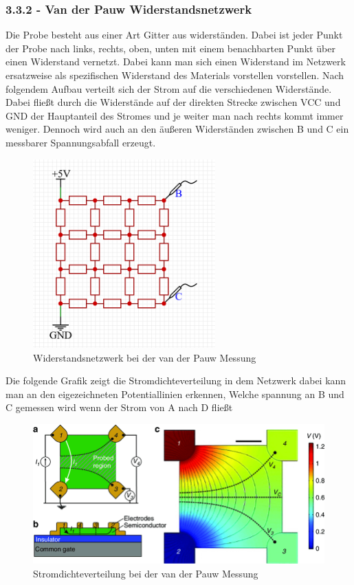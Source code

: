 \documentclass[a4paper]{scrartcl}
\numberwithin{equation}{subsection}
\begin{document}
\subsubsection{3.3.2 - Van der Pauw Widerstandsnetzwerk}
Die Probe besteht aus einer Art Gitter aus widerständen. Dabei ist jeder Punkt der Probe nach links, rechts, oben, unten mit einem benachbarten Punkt über einen Widerstand vernetzt. Dabei kann man sich einen Widerstand im Netzwerk ersatzweise als spezifischen Widerstand des Materials vorstellen vorstellen. Nach folgendem Aufbau verteilt sich der Strom auf die verschiedenen Widerstände. Dabei fließt durch die Widerstände auf der direkten Strecke zwischen VCC und GND der Hauptanteil des Stromes und je weiter man nach rechts kommt immer weniger. Dennoch wird auch an den äußeren Widerständen zwischen B und C ein messbarer Spannungsabfall erzeugt.

\begin{figure}[H]
\includegraphics[width=7cm]{Widerstandsnetzwerk_v3}
\centering
\caption{Widerstandsnetzwerk bei der van der Pauw Messung}
\centering
\label{fig:widerstandsnetzwerk}
\end{figure}

Die folgende Grafik zeigt die Stromdichteverteilung in dem Netzwerk dabei kann man an den eigezeichneten Potentiallinien erkennen, Welche spannung an B und C gemessen wird wenn der Strom von A nach D fließt

\begin{figure}[H]
\includegraphics[width=12cm]{Top-view-of-van-der-Pauw-square-shaped}
\centering
\caption{Stromdichteverteilung bei der van der Pauw Messung \protect\footnotemark}
\centering
\label{fig:top-view-of-van-der-pauw}
\end{figure}
\end{document}
